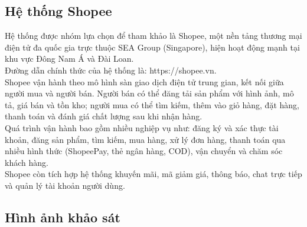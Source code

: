 \subsection{Hệ thống Shopee}
Hệ thống được nhóm lựa chọn để tham khảo là Shopee, một nền tảng thương mại điện tử đa quốc gia trực thuộc SEA Group (Singapore), hiện hoạt động mạnh tại khu vực Đông Nam Á và Đài Loan.
\\ Đường dẫn chính thức của hệ thống là: https://shopee.vn.
\\ Shopee vận hành theo mô hình sàn giao dịch điện tử trung gian, kết nối giữa người mua và người bán. Người bán có thể đăng tải sản phẩm với hình ảnh, mô tả, giá bán và tồn kho; người mua có thể tìm kiếm, thêm vào giỏ hàng, đặt hàng, thanh toán và đánh giá chất lượng sau khi nhận hàng.
\\ Quá trình vận hành bao gồm nhiều nghiệp vụ như: đăng ký và xác thực tài khoản, đăng sản phẩm, tìm kiếm, mua hàng, xử lý đơn hàng, thanh toán qua nhiều hình thức (ShopeePay, thẻ ngân hàng, COD), vận chuyển và chăm sóc khách hàng.
\\  Shopee còn tích hợp hệ thống khuyến mãi, mã giảm giá, thông báo, chat trực tiếp và quản lý tài khoản người dùng.
\subsection{Hình ảnh khảo sát}